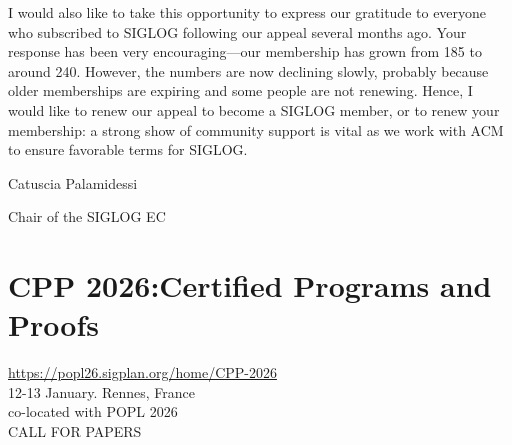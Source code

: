 \documentclass[prodmode,acmtecs]{acmsmall} %
\begin{document}
\begin{itemize}
  I would also like to take this opportunity to express our gratitude to everyone who subscribed to SIGLOG following our appeal several months ago. Your response has been very encouraging—our membership has grown from 185 to around 240. However, the numbers are now declining slowly, probably because older memberships are expiring and some people are not renewing. Hence, I would like to renew our appeal to become a SIGLOG member, or to renew your membership: a strong show of community support is vital as we work with ACM to ensure favorable terms for SIGLOG. 
 
  Catuscia Palamidessi 
 
  Chair of the SIGLOG EC 
 
\end{itemize}\section{CPP 2026:Certified Programs and Proofs}\label{CPP2026}  \href{https://popl26.sigplan.org/home/CPP-2026}{https://popl26.sigplan.org/home/CPP-2026}\\ 
  12-13 January.  Rennes, France\\ 
  co-located with POPL 2026\\ 
CALL FOR PAPERS 
\end{document}
